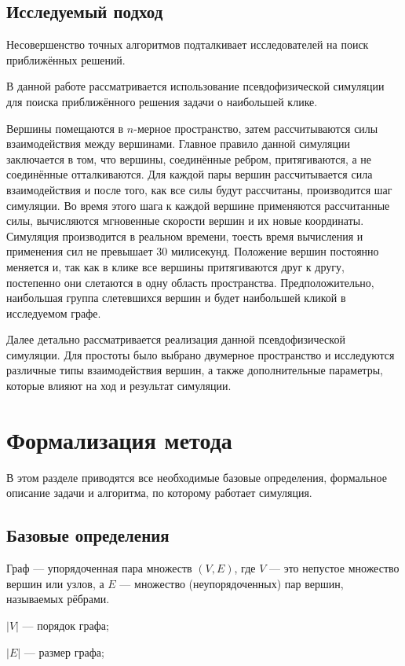   \subsection{Исследуемый подход}
    Несовершенство точных алгоритмов подталкивает исследователей на поиск 
    приближённых решений.

    В данной работе рассматривается использование псевдофизической симуляции для
    поиска приближённого решения задачи о наибольшей клике.

    Вершины помещаются в $n$-мерное пространство, затем рассчитываются силы
    взаимодействия между вершинами.
    Главное правило данной симуляции заключается в том, что вершины, соединённые
    ребром, притягиваются, а не соединённые отталкиваются.
    Для каждой пары вершин рассчитывается сила взаимодействия и после того, как
    все силы будут рассчитаны, производится шаг симуляции.
    Во время этого шага к каждой вершине применяются рассчитанные силы,
    вычисляются мгновенные скорости вершин и их новые координаты.
    Симуляция производится в реальном времени, тоесть время вычисления и
    применения сил не превышает 30 милисекунд.
    Положение вершин постоянно меняется и, так как в клике все вершины притягиваются
    друг к другу, постепенно они слетаются в одну область пространства.
    Предположительно, наибольшая группа слетевшихся вершин и будет наибольшей кликой
    в исследуемом графе.

    Далее детально рассматривается реализация данной псевдофизической симуляции.
    Для простоты было выбрано двумерное пространство и исследуются различные типы
    взаимодействия вершин, а также дополнительные параметры, которые влияют на ход 
    и результат симуляции.
    \clearpage

\section{Формализация метода}
  В этом разделе приводятся все необходимые базовые определения, формальное описание
  задачи и алгоритма, по которому работает симуляция.

  \subsection{Базовые определения}
    \begin{definition}\label{graph_def}
      Граф --- упорядоченная пара множеств $\left(V, E\right)$, где $V$ --- это непустое множество
      вершин или узлов, а $E$ --- множество (неупорядоченных) пар вершин, называемых
      рёбрами.

      $|V|$ --- порядок графа;

      $|E|$ --- размер графа;
    \end{definition}

